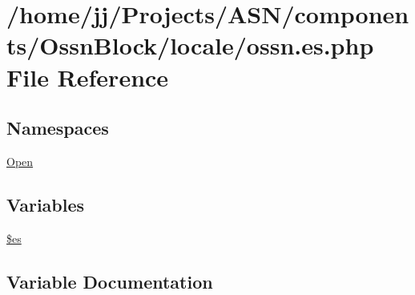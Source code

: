 \hypertarget{components_2_ossn_block_2locale_2ossn_8es_8php}{}\section{/home/jj/\+Projects/\+A\+S\+N/components/\+Ossn\+Block/locale/ossn.es.\+php File Reference}
\label{components_2_ossn_block_2locale_2ossn_8es_8php}
\subsection*{Namespaces}
\begin{DoxyCompactItemize}
\item 
 \hyperlink{namespace_open}{Open}
\end{DoxyCompactItemize}
\subsection*{Variables}
\begin{DoxyCompactItemize}
\item 
\hyperlink{components_2_ossn_block_2locale_2ossn_8es_8php_a388cbda27103d2baee3997798d1f2744}{\$es}
\end{DoxyCompactItemize}


\subsection{Variable Documentation}
